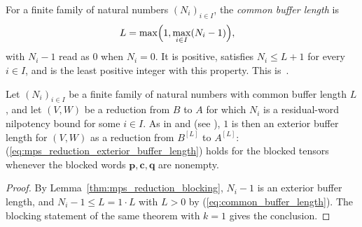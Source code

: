 \begin{definition}
    \label{def:common_buffer_length}
    \leanok
    For a finite family of natural numbers $(N_i)_{i\in I}$, the
    \emph{common buffer length} is
    \begin{align}
        L & =\max\Bigl(1,\max_{i\in I}(N_i-1)\Bigr),
        \label{eq:common_buffer_length}
    \end{align}
    with $N_i-1$ read as $0$ when $N_i=0$.  It is positive, satisfies
    $N_i\leq L+1$ for every $i\in I$, and is the least positive integer with
    this property.
    This is~\cite[``Common buffer length of a finite
        family'']{QICLean2026Blueprint}.
\end{definition}

\begin{lemma}
    \label{thm:mps_reduction_common_blocking}
    \leanok
    Let $(N_i)_{i\in I}$ be a finite family of natural numbers with common
    buffer length $L$, and let $(V,W)$ be a reduction from $B$ to $A$ for
    which $N_i$ is a residual-word nilpotency bound for some $i\in I$.  As in
    \cite{FrancoRubio2025MPUGauging} and
    \cite[Theorem~1 footnote]{GarreRubioSchuch2024DomainWall} (see
    \cite{gap:mgsc18_nilpotency_length_one_terminology}), $1$ is then an
    exterior buffer length for $(V,W)$ as a reduction from $B^{[L]}$ to
    $A^{[L]}$: (\ref{eq:mps_reduction_exterior_buffer_length}) holds for the
    blocked tensors whenever the blocked words $\mathbf p,\mathbf c,\mathbf q$
    are nonempty.
\end{lemma}

\begin{proof}
    \leanok
    By Lemma~\ref{thm:mps_reduction_blocking}, $N_i-1$ is an exterior
    buffer length, and $N_i-1\leq L=1\cdot L$ with $L>0$ by
    (\ref{eq:common_buffer_length}).  The blocking statement of the same
    theorem with $k=1$ gives the conclusion.
\end{proof}

